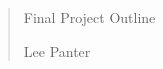 \documentclass{article}
\begin{document}
\vspace*{\fill} 
\begin{quote} 
\centering 

\begin{Huge}
Final Project Outline 
\end{Huge}

\begin{Large}
Lee Panter
\end{Large}

\end{quote}
\vspace*{\fill}
\end{document}
